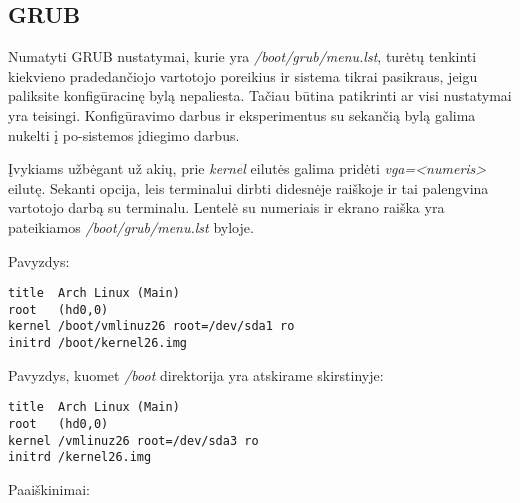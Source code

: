 \subsection{GRUB}

  Numatyti GRUB nustatymai, kurie yra \textsl{/boot/grub/menu.lst},
  turėtų tenkinti kiekvieno pradedančiojo vartotojo poreikius ir
  sistema tikrai pasikraus, jeigu paliksite konfigūracinę bylą
  nepaliesta. Tačiau būtina patikrinti ar visi nustatymai yra
  teisingi. Konfigūravimo darbus ir eksperimentus su sekančią bylą
  galima nukelti į po-sistemos įdiegimo darbus.

  Įvykiams užbėgant už akių, prie \textsl{kernel} eilutės galima
  pridėti \textit{vga=<numeris>} eilutę. Sekanti opcija, leis
  terminalui dirbti didesnėje raiškoje ir tai palengvina vartotojo
  darbą su terminalu. Lentelė su numeriais ir ekrano raiška yra
  pateikiamos \textsl{/boot/grub/menu.lst} byloje.

  Pavyzdys:

  \begin{verbatim}
title  Arch Linux (Main)
root   (hd0,0)
kernel /boot/vmlinuz26 root=/dev/sda1 ro
initrd /boot/kernel26.img
  \end{verbatim}

  Pavyzdys, kuomet \textsl{/boot} direktorija yra atskirame
  skirstinyje:

  \begin{verbatim}
title  Arch Linux (Main)
root   (hd0,0)
kernel /vmlinuz26 root=/dev/sda3 ro
initrd /kernel26.img
  \end{verbatim}

  Paaiškinimai:

